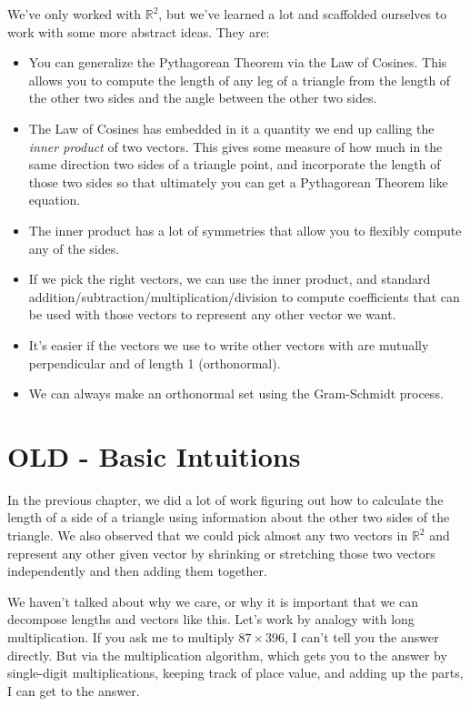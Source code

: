\documentclass[
]{book}
\providecommand{\tightlist}{%
  \setlength{\itemsep}{0pt}\setlength{\parskip}{0pt}}
\begin{document}
We've only worked with \(\mathbb{R}^2\), but we've learned a lot and scaffolded ourselves to work with some more abstract ideas. They are:

\begin{itemize}
\tightlist
\item
  You can generalize the Pythagorean Theorem via the Law of Cosines. This allows you to compute the length of any leg of a triangle from the length of the other two sides and the angle between the other two sides.
\item
  The Law of Cosines has embedded in it a quantity we end up calling the \emph{inner product} of two vectors. This gives some measure of how much in the same direction two sides of a triangle point, and incorporate the length of those two sides so that ultimately you can get a Pythagorean Theorem like equation.
\item
  The inner product has a lot of symmetries that allow you to flexibly compute any of the sides.
\item
  If we pick the right vectors, we can use the inner product, and standard addition/subtraction/multiplication/division to compute coefficients that can be used with those vectors to represent any other vector we want.
\item
  It's easier if the vectors we use to write other vectors with are mutually perpendicular and of length 1 (orthonormal).
\item
  We can always make an orthonormal set using the Gram-Schmidt process.
\end{itemize}

\hypertarget{old---basic-intuitions}{%
\chapter{OLD - Basic Intuitions}\label{old---basic-intuitions}}

In the previous chapter, we did a lot of work figuring out how to calculate the length of a side of a triangle using information about the other two sides of the triangle. We also observed that we could pick almost any two vectors in \(\mathbb{R}^2\) and represent any other given vector by shrinking or stretching those two vectors independently and then adding them together.

We haven't talked about why we care, or why it is important that we can decompose lengths and vectors like this. Let's work by analogy with long multiplication. If you ask me to multiply \(87 \times 396\), I can't tell you the answer directly. But via the multiplication algorithm, which gets you to the answer by single-digit multiplications, keeping track of place value, and adding up the parts, I can get to the answer.
\end{document}
